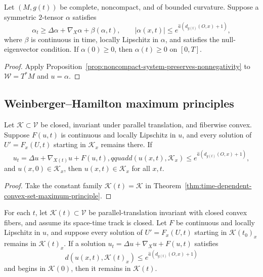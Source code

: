 \begin{theorem}
\label{thm:noncompact-two-tensor-maximum-principle}
Let $(M,g(t))$ be complete, noncompact, and of bounded curvature.  Suppose a
symmetric $2$-tensor $\alpha$ satisfies
\[
\alpha_t\geq\Delta\alpha+\nabla_X\alpha+\beta(\alpha,t),
\qquad
|\alpha(x,t)|\leq e^{\widehat a(d_{g(t)}(O,x)+1)},
\]
where $\beta$ is continuous in time, locally Lipschitz in $\alpha$, and
satisfies the null-eigenvector condition.  If $\alpha(0)\geq0$, then
$\alpha(t)\geq0$ on $[0,T]$.
\end{theorem}

\begin{proof}
Apply Proposition~\ref{prop:noncompact-system-preserves-nonnegativity} to
$\mathcal W=T^*M$ and $u=\alpha$.
\end{proof}

\subsection{Weinberger--Hamilton maximum principles}

\begin{theorem}
\label{thm:weinberger-hamilton-noncompact-systems}
Let $\mathcal K\subset\mathcal V$ be closed, invariant under parallel
translation, and fiberwise convex.  Suppose $F(u,t)$ is continuous and locally
Lipschitz in $u$, and every solution of $U'=F_x(U,t)$ starting in
$\mathcal K_x$ remains there.  If
\[
u_t=\Delta u+\nabla_{X(t)}u+F(u,t),qquad
d(u(x,t),\mathcal K_x)\leq e^{\widehat a(d_{g(t)}(O,x)+1)},
\]
and $u(x,0)\in\mathcal K_x$, then $u(x,t)\in\mathcal K_x$ for all $x,t$.
\end{theorem}

\begin{proof}
Take the constant family $\mathcal K(t)=\mathcal K$ in
Theorem~\ref{thm:time-dependent-convex-set-maximum-principle}.
\end{proof}

\begin{theorem}
\label{thm:time-dependent-convex-set-maximum-principle}
For each $t$, let $\mathcal K(t)\subset\mathcal V$ be parallel-translation
invariant with closed convex fibers, and assume its space-time track is
closed.  Let $F$ be continuous and locally Lipschitz in $u$, and suppose every
solution of $U'=F_x(U,t)$ starting in $\mathcal K(t_0)_x$ remains in
$\mathcal K(t)_x$.  If a solution
$u_t=\Delta u+\nabla_Xu+F(u,t)$ satisfies
\[
d(u(x,t),\mathcal K(t)_x)\leq
e^{\widehat a(d_{g(t)}(O,x)+1)}
\]
and begins in $\mathcal K(0)$, then it remains in $\mathcal K(t)$.
\end{theorem}

